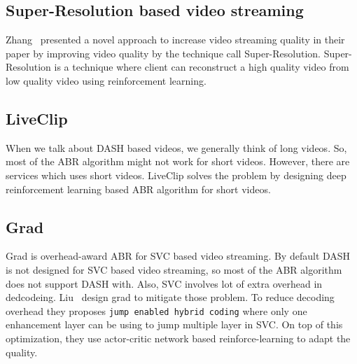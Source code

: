 \subsection{Super-Resolution based video streaming}
Zhang \etal\ presented a novel approach to increase video streaming quality in their paper \cite{9155384} by improving video quality by the technique call Super-Resolution. Super-Resolution is a technique where client can reconstruct a high quality video from low quality video using reinforcement learning.

\subsection{LiveClip}
When we talk about DASH based videos, we generally think of long videos. So, most of the ABR algorithm might not work for short videos. However, there are services which uses short videos. LiveClip\cite{10.1145/3386290.3396937} solves the problem by designing deep reinforcement learning based ABR algorithm for short videos.

\subsection{Grad}
Grad\cite{10.1145/3394171.3413512} is overhead-award ABR for SVC based video streaming. By default DASH is not designed for SVC based video streaming, so most of the ABR algorithm does not support DASH with. Also, SVC involves lot of extra overhead in dedcodeing. Liu \etal\ design grad to mitigate those problem. To reduce decoding overhead they proposes {\tt jump enabled hybrid coding} where only one enhancement layer can be using to jump multiple layer in SVC. On top of this optimization, they use actor-critic network based reinforce-learning to adapt the quality.